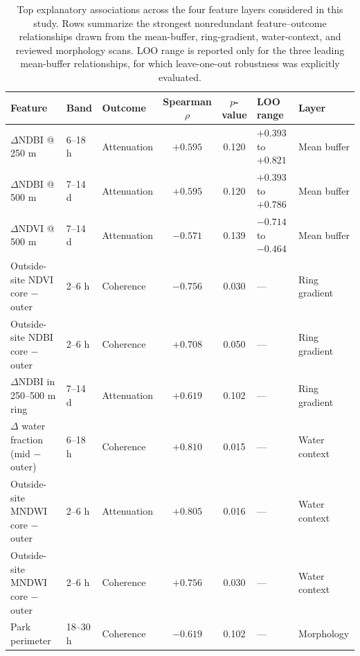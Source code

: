 \begin{table}[htbp]
\centering
\caption{Top explanatory associations across the four feature layers considered in this study. Rows summarize the strongest nonredundant feature--outcome relationships drawn from the mean-buffer, ring-gradient, water-context, and reviewed morphology scans. LOO range is reported only for the three leading mean-buffer relationships, for which leave-one-out robustness was explicitly evaluated.}
\label{tab:top_explanatory_associations}
\begingroup
\setlength{\tabcolsep}{3.6pt}
\renewcommand{\arraystretch}{1.12}
\scriptsize
\begin{tabular}{p{4.1cm}p{1.8cm}p{1.8cm}ccp{2.4cm}p{2.2cm}}
\toprule
Feature & Band & Outcome & Spearman $\rho$ & $p$-value & LOO range & Layer \\
\midrule
$\Delta$NDBI @ 250 m & 6--18 h & Attenuation & $+0.595$ & 0.120 & $+0.393$ to $+0.821$ & Mean buffer \\
$\Delta$NDBI @ 500 m & 7--14 d & Attenuation & $+0.595$ & 0.120 & $+0.393$ to $+0.786$ & Mean buffer \\
$\Delta$NDVI @ 500 m & 7--14 d & Attenuation & $-0.571$ & 0.139 & $-0.714$ to $-0.464$ & Mean buffer \\
Outside-site NDVI core $-$ outer & 2--6 h & Coherence & $-0.756$ & 0.030 & --- & Ring gradient \\
Outside-site NDBI core $-$ outer & 2--6 h & Coherence & $+0.708$ & 0.050 & --- & Ring gradient \\
$\Delta$NDBI in 250--500 m ring & 7--14 d & Attenuation & $+0.619$ & 0.102 & --- & Ring gradient \\
$\Delta$ water fraction (mid $-$ outer) & 6--18 h & Coherence & $+0.810$ & 0.015 & --- & Water context \\
Outside-site MNDWI core $-$ outer & 2--6 h & Attenuation & $+0.805$ & 0.016 & --- & Water context \\
Outside-site MNDWI core $-$ outer & 2--6 h & Coherence & $+0.756$ & 0.030 & --- & Water context \\
Park perimeter & 18--30 h & Coherence & $-0.619$ & 0.102 & --- & Morphology \\
\bottomrule
\end{tabular}
\endgroup
\end{table}